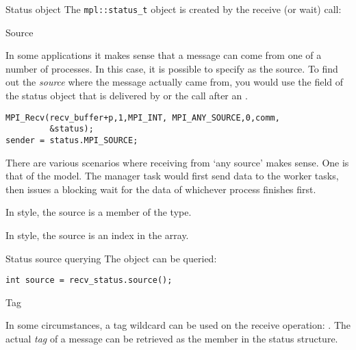 \begin{mplnote}{Status object}
  The \lstinline+mpl::status_t+ object is created by the receive
  (or wait) call:
\end{mplnote}

 {Source}
\label{sec:mpi-source}

In some applications it makes sense that a message can come from 
one of a number of processes. In this case, it is possible to specify
 as the source.
%
To find out the \emph{source}
where the message actually came from,
you would use the  field of the status object
that is delivered by 
or the  call after an .
\begin{lstlisting}
MPI_Recv(recv_buffer+p,1,MPI_INT, MPI_ANY_SOURCE,0,comm,
         &status);
sender = status.MPI_SOURCE;
\end{lstlisting}

There are various scenarios where receiving from `any source' makes sense.
One is that of the  model. The manager task would first send
data to the worker tasks, then issues a blocking wait for the data of whichever process
finishes first.

In  style, the source is a member of the  type.


In  style, the source is an index in the  array.


\begin{mplnote}{Status source querying}
The  object can be queried:
\begin{lstlisting}
int source = recv_status.source();
\end{lstlisting}
\end{mplnote}

 {Tag}
\label{sec:mpi-tag}

In some circumstances, a tag wildcard can be used on the receive operation:
.
The actual
\emph{tag}
of a message can be retrieved as the
%
%
member in the status structure.

